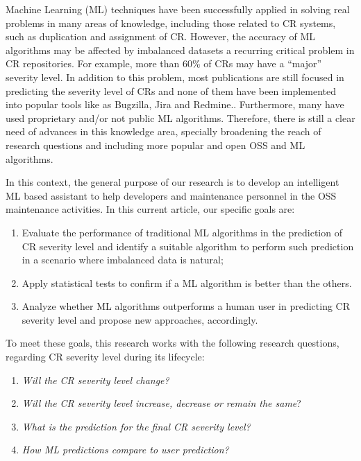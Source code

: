 Machine Learning (ML) techniques have been successfully applied in solving real problems in many areas of knowledge, including those related to CR systems, such as duplication and assignment of CR\cite{Cavalcanti2014}. However, the accuracy of ML algorithms may be affected by imbalanced datasets \cite{Chawla2009} \textemdash  a recurring critical problem in CR repositories\cite{Tian2015}. For example, more than 60\% of CRs may have a ``major'' severity level. In addition to this problem, most publications are still focused in predicting the severity level of CRs and none of them have been implemented into popular tools like as Bugzilla, Jira and Redmine.\cite{Cavalcanti2014}. Furthermore, many have used proprietary and/or not public ML algorithms. Therefore, there is still a clear need of advances in this knowledge area, specially broadening the reach of research questions and including more popular and open OSS and ML algorithms.

In this context, the general purpose of our research is to develop an intelligent ML based assistant to help developers and maintenance personnel in the OSS maintenance activities. In this current article, our specific goals are: 

\begin{enumerate}[label=\textbf{G$_\arabic*$}.]
  \item Evaluate the performance of traditional ML algorithms in the prediction of CR severity level and identify a suitable algorithm to perform such prediction in a scenario where imbalanced data is natural;
  \item Apply statistical tests to confirm if a ML algorithm is better than the others.  
  \item Analyze whether ML algorithms outperforms a human user in predicting CR severity level and propose new approaches, accordingly. 
\end{enumerate}

To meet these goals, this research works with the following research questions, regarding CR severity level during its lifecycle:

\begin{enumerate}[label=\textbf{RQ$_\arabic*$}.]
  \item \textit{Will the CR severity level change?}
  \item \textit{Will the CR severity level increase, decrease or remain the same}? 
  \item \textit{What is the prediction for the final CR severity level?}
  \item \textit{How ML predictions compare to user prediction?} 
\end{enumerate}

